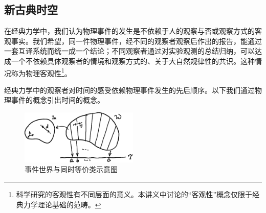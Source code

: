 \documentclass[main.tex]{subfiles}
\begin{document}
\subsection{新古典时空}
在经典力学中，我们认为物理事件的发生是不依赖于人的观察与否或观察方式的客观事实。我们希望，同一件物理事件，经不同的观察者观察后作出的报告，能通过一套互译系统而统一成一个结论；不同观察者通过对实验观测的总结归纳，可以达成一个不依赖具体观察者的情境和观察方式的、关于大自然规律性的共识。这种情况称为物理客观性\footnote{科学研究的客观性有不同层面的意义\cite{Reiss2020}。本讲义中讨论的“客观性”概念仅限于经典力学理论基础的范畴。}。

经典力学中的观察者对时间的感受依赖物理事件发生的先后顺序。以下我们通过物理事件的概念引出时间的概念。

\begin{figure}[h]
    \centering
    \includegraphics[width=0.5\textwidth]{images/III.1.2.eps}
    \caption{事件世界与同时等价类示意图}
    \label{fig:III.1.2}
\end{figure}
\end{document}
